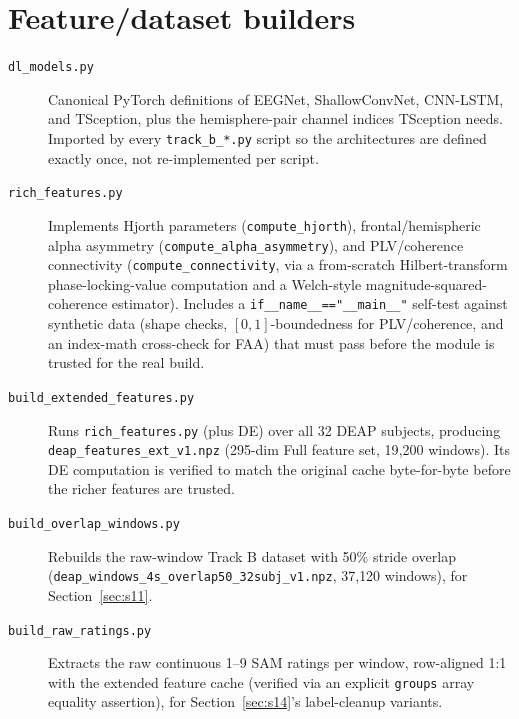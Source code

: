 \documentclass[11pt]{report}
\begin{document}
\section{Feature/dataset builders}
\begin{description}
  \item[\texttt{dl\_models.py}] Canonical PyTorch definitions of EEGNet,
        ShallowConvNet, CNN-LSTM, and TSception, plus the hemisphere-pair
        channel indices TSception needs. Imported by every
        \texttt{track\_b\_*.py} script so the architectures are defined
        exactly once, not re-implemented per script.
  \item[\texttt{rich\_features.py}] Implements Hjorth parameters
        (\texttt{compute\_hjorth}), frontal/hemispheric alpha asymmetry
        (\texttt{compute\_alpha\_asymmetry}), and PLV/coherence connectivity
        (\texttt{compute\_connectivity}, via a from-scratch Hilbert-transform
        phase-locking-value computation and a Welch-style
        magnitude-squared-coherence estimator). Includes a
        \texttt{if\_\_name\_\_=="\_\_main\_\_"} self-test against synthetic
        data (shape checks, $[0,1]$-boundedness for PLV/coherence, and an
        index-math cross-check for FAA) that must pass before the module is
        trusted for the real build.
  \item[\texttt{build\_extended\_features.py}] Runs \texttt{rich\_features.py}
        (plus DE) over all 32 DEAP subjects, producing
        \texttt{deap\_features\_ext\_v1.npz} (295-dim Full feature set,
        19{,}200 windows). Its DE computation is verified to match the
        original cache byte-for-byte before the richer features are trusted.
  \item[\texttt{build\_overlap\_windows.py}] Rebuilds the raw-window Track B
        dataset with 50\% stride overlap
        (\texttt{deap\_windows\_4s\_overlap50\_32subj\_v1.npz}, 37{,}120
        windows), for Section~\ref{sec:s11}.
  \item[\texttt{build\_raw\_ratings.py}] Extracts the raw continuous 1--9
        SAM ratings per window, row-aligned 1:1 with the extended feature
        cache (verified via an explicit \texttt{groups} array equality
        assertion), for Section~\ref{sec:s14}'s label-cleanup variants.
\end{description}
\end{document}
